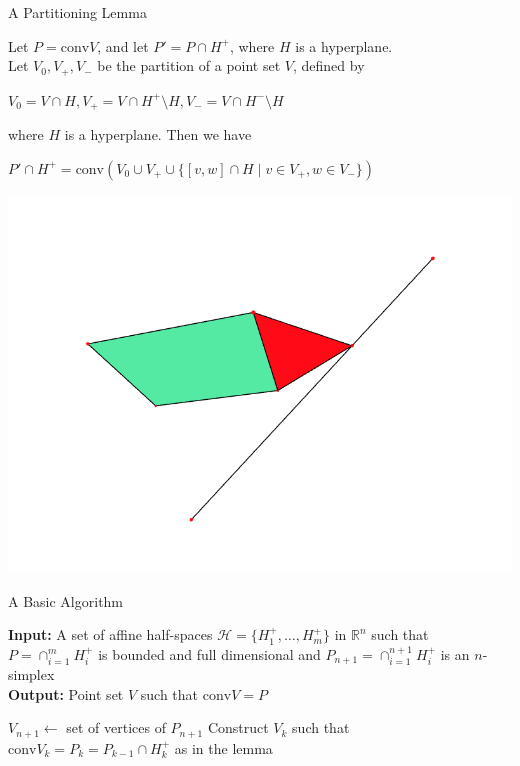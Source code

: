 \documentclass[9pt]{beamer}
\newcommand\R{\mathbb{R}}
\newcommand\set[1]{\{#1\}}
\theoremstyle{definition}
\begin{document}
\begin{frame}[fragile]{A Partitioning Lemma}
  \begin{lemma}
    Let $P = \text{conv}V$, and let $P' = P \cap H^+$, where $H$ is a hyperplane. \\
    Let $V_0, V_+, V_-$ be the partition of a point set $V$, defined by
    \begin{center}
      $V_0 = V \cap H, V_+ = V \cap H^+ \setminus H, V_- = V \cap H^- \setminus H$
    \end{center}
    where $H$ is a hyperplane. Then we have
    \begin{center}
      $P' \cap H^+ =
      \text{conv}(V_0 \cup V_+ \cup \set{[v, w] \cap H \mid v \in V_+ , w \in V_-})$
      \end{center}
  \end{lemma}
    \begin{center}
    \includegraphics[width=.50\textwidth, height=0.4\textheight]{images/lemma}
  \end{center}
\end{frame}

\begin{frame}[fragile]{A Basic Algorithm }
  \begin{algorithm}[H]
    \textbf{Input:} A set of affine half-spaces $\mathcal{H} = \set{H_1^+, \dots, H_m^+}$
    in $\R^n$ such that $P = \cap_{i=1}^m H_i^+$ is bounded and full dimensional
    and $P_{n+1} = \cap_{i=1}^{n+1}H_i^+$ is an $n$-simplex\\
    \textbf{Output:} Point set $V$ such that $\text{conv}V = P$
    \begin{algorithmic}[1]
      \STATE $V_{n+1} \leftarrow$ set of vertices of $P_{n+1}$
      \STATE Construct $V_k$ such that $\text{conv}V_k = P_k = P_{k-1} \cap H_k^+$ as in the lemma
      \ENDFOR
    \end{algorithmic}
  \end{algorithm}
\end{frame}
\end{document}
